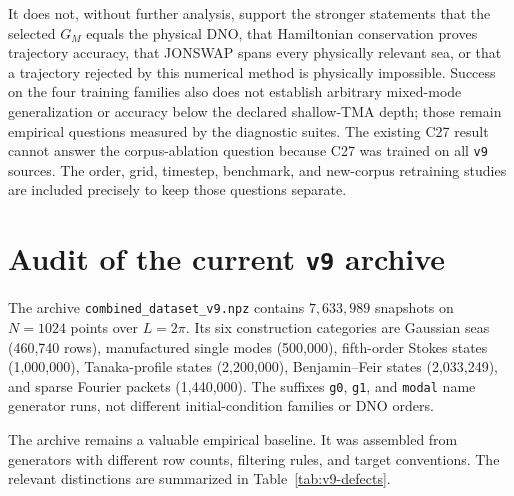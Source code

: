 \documentclass[11pt]{article}
\begin{document}
It does not, without further analysis, support the stronger statements that
the selected $G_M$ equals the physical DNO, that Hamiltonian conservation proves trajectory
accuracy, that JONSWAP spans every physically relevant sea, or that a
trajectory rejected by this numerical method is physically impossible.
Success on the four training families also does not establish arbitrary
mixed-mode generalization or accuracy below the declared shallow-TMA depth;
those remain empirical questions measured by the diagnostic suites.  The
existing C27 result cannot answer the corpus-ablation question because C27
was trained on all \texttt{v9} sources.  The order, grid, timestep, benchmark,
and new-corpus retraining studies are included precisely to keep those
questions separate.

\appendix

\section{Audit of the current \texttt{v9} archive}
\label{sec:v9}

The archive \texttt{combined\_dataset\_v9.npz} contains $7{,}633{,}989$
snapshots on $N=1024$ points over $L=2\pi$.  Its six construction categories
are Gaussian seas (460,740 rows), manufactured single modes (500,000),
fifth-order Stokes states (1,000,000), Tanaka-profile states (2,200,000),
Benjamin--Feir states (2,033,249), and sparse Fourier packets (1,440,000).
The suffixes \texttt{g0}, \texttt{g1}, and \texttt{modal} name generator runs,
not different initial-condition families or DNO orders.

The archive remains a valuable empirical baseline.  It was assembled from
generators with different row counts, filtering rules, and target
conventions.  The relevant distinctions are summarized in
Table~\ref{tab:v9-defects}.
\end{document}
